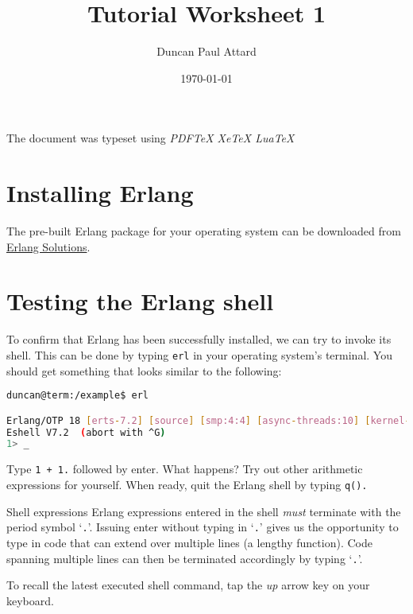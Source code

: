 \documentclass[11pt, a4paper]{article}
\begin{document}
  \title{Tutorial Worksheet 1}
  \author{Duncan Paul Attard}
  \date{\today}
  \maketitle

  \begin{center}
    The document was typeset using {\textit{
    \ifPDFTeX
      PDFTeX
    \else
      \ifXeTeX
        XeTeX
      \else
        LuaTeX
      \fi
    \fi}}
  \end{center}

  \section{Installing Erlang}

  The pre-built Erlang package for your operating system can be downloaded from \href{https://www.erlang-solutions.com/resources/download.html}{Erlang Solutions}.

  \section{Testing the Erlang shell}

  To confirm that Erlang has been successfully installed, we can try to invoke its shell.
  This can be done by typing \texttt{erl} in your operating system's terminal.
  You should get something that looks similar to the following:

\begin{lstlisting}[language=bash]
duncan@term:/example$ erl

Erlang/OTP 18 [erts-7.2] [source] [smp:4:4] [async-threads:10] [kernel-poll:false]
Eshell V7.2  (abort with ^G)
1> _
\end{lstlisting}

  Type \texttt{1 + 1.} followed by enter.
  What happens?
  Try out other arithmetic expressions for yourself.
  When ready, quit the Erlang shell by typing \texttt{q().}

  \begin{block}{Shell expressions}
    Erlang expressions entered in the shell \emph{must} terminate with the period symbol `\texttt{.}'.
    Issuing enter without typing in `\texttt{.}' gives us the opportunity to type in code that can extend over multiple lines (\eg a lengthy function).
    Code spanning multiple lines can then be terminated accordingly by typing `\texttt{.}'.

    \medskip
    To recall the latest executed shell command, tap the \emph{up} arrow key on your keyboard.
  \end{block}
\end{document}
